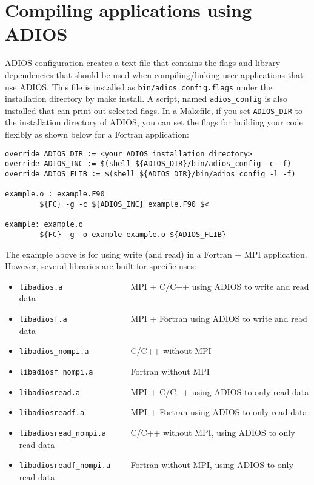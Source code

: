 \section{Compiling applications using ADIOS}
\label{section:installation_compiling_apps}

ADIOS configuration creates a text file that contains the flags and library dependencies
that should be used when compiling/linking user applications that use ADIOS. This
file is installed as \verb+bin/adios_config.flags+ under the installation directory by
make install. A script, named \verb+adios_config+ is also installed that can print out
selected flags. In a Makefile, if you set \verb+ADIOS_DIR+ to the installation directory
of ADIOS, you can set the flags for building your code flexibly as shown below
for a Fortran application:

\begin{lstlisting}
override ADIOS_DIR := <your ADIOS installation directory>
override ADIOS_INC := $(shell ${ADIOS_DIR}/bin/adios_config -c -f)
override ADIOS_FLIB := $(shell ${ADIOS_DIR}/bin/adios_config -l -f)

example.o : example.F90
        ${FC} -g -c ${ADIOS_INC} example.F90 $<

example: example.o
        ${FC} -g -o example example.o ${ADIOS_FLIB}
\end{lstlisting}

The example above is for using write (and read) in a Fortran + MPI application. However, several libraries are built for specific uses:

\begin{itemize}
\item \verb+libadios.a               +   MPI + C/C++ using ADIOS to write and read data
\item \verb+libadiosf.a              +   MPI + Fortran using ADIOS to write and read data
\item \verb+libadios_nompi.a         +   C/C++ without MPI
\item \verb+libadiosf_nompi.a        +   Fortran without MPI
\item \verb+libadiosread.a           +   MPI + C/C++ using ADIOS to only read data
\item \verb+libadiosreadf.a          +   MPI + Fortran using ADIOS to only read data
\item \verb+libadiosread_nompi.a     +   C/C++ without MPI, using ADIOS to only read data
\item \verb+libadiosreadf_nompi.a    +   Fortran without MPI, using ADIOS to only read data
\end{itemize}

